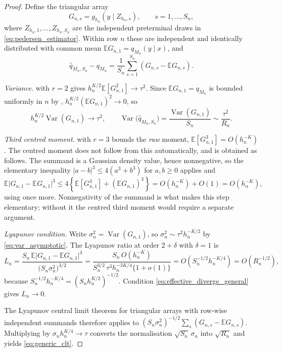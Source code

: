 \documentclass[11pt]{article}
\theoremstyle{definition}
\newcommand{\E}{\mathbb{E}}
\newcommand{\Var}{\operatorname{Var}}
\begin{document}
\begin{proof}
Define the triangular array
\[
G_{n,s}=g_{h_n}(y\mid Z_{h_n,s}),
\qquad s=1,\ldots,S_n,
\]
where $Z_{h_n,1},\ldots,Z_{h_n,S_n}$ are the independent preterminal draws in \eqref{eq:pedersen_estimator}. Within row $n$ these are independent and identically distributed with common mean $\E G_{n,1}=q_{M_n}(y\mid x)$, and
\[
\widehat q_{M_n,S_n}-q_{M_n}=\frac1{S_n}\sum_{s=1}^{S_n}\left(G_{n,s}-\E G_{n,s}\right).
\]

\emph{Variance.}  with $r=2$ gives $h_n^{K/2}\E[G_{n,1}^2]\to\tau^2$. Since $\E G_{n,1}=q_{M_n}$ is bounded uniformly in $n$ by , $h_n^{K/2}(\E G_{n,1})^2\to0$, so
\begin{equation}\label{eq:var_asymptotic}
h_n^{K/2}\Var(G_{n,1})\longrightarrow\tau^2,
\qquad
\Var\bigl(\widehat q_{M_n,S_n}\bigr)=\frac{\Var(G_{n,1})}{S_n}\sim\frac{\tau^2}{R_n}.
\end{equation}

\emph{Third centred moment.}  with $r=3$ bounds the \emph{raw} moment, $\E[G_{n,1}^3]=O(h_n^{-K})$. The centred moment does not follow from this automatically, and is obtained as follows. The summand is a Gaussian density value, hence nonnegative, so the elementary inequality $|a-b|^3\le4(a^3+b^3)$ for $a,b\ge0$ applies and
\begin{equation}\label{eq:third_centred}
\E\lvert G_{n,1}-\E G_{n,1}\rvert^3
\le4\left\{\E[G_{n,1}^3]+(\E G_{n,1})^3\right\}
=O(h_n^{-K})+O(1)=O(h_n^{-K}),
\end{equation}
using  once more. Nonnegativity of the summand is what makes this step elementary; without it the centred third moment would require a separate argument.

\emph{Lyapunov condition.} Write $\sigma_n^2=\Var(G_{n,1})$, so $\sigma_n^2\sim\tau^2h_n^{-K/2}$ by \eqref{eq:var_asymptotic}. The Lyapunov ratio at order $2+\delta$ with $\delta=1$ is
\[
L_n=\frac{S_n\,\E\lvert G_{n,1}-\E G_{n,1}\rvert^3}{\bigl(S_n\sigma_n^2\bigr)^{3/2}}
=\frac{S_n\,O(h_n^{-K})}{S_n^{3/2}\,\tau^3h_n^{-3K/4}\{1+o(1)\}}
=O\!\left(S_n^{-1/2}h_n^{-K/4}\right)
=O\!\left(R_n^{-1/2}\right),
\]
because $S_n^{-1/2}h_n^{-K/4}=(S_nh_n^{K/2})^{-1/2}$. Condition \eqref{eq:effective_diverge_general} gives $L_n\to0$.

The Lyapunov central limit theorem for triangular arrays with row-wise independent summands therefore applies to $(S_n\sigma_n^2)^{-1/2}\sum_s(G_{n,s}-\E G_{n,s})$. Multiplying by $\sigma_nh_n^{K/4}\to\tau$ converts the normalisation $\sqrt{S_n}\,\sigma_n$ into $\sqrt{R_n}$ and yields \eqref{eq:generic_clt}.
\end{proof}
\end{document}
